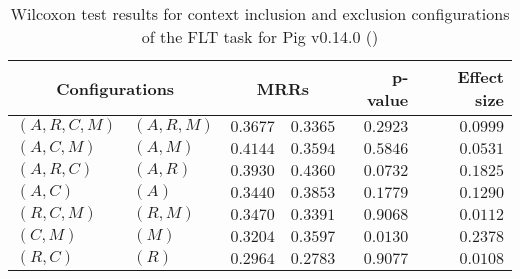
\begin{table}
\begin{spacing}{1.2}
\centering
\caption{Wilcoxon test results for context inclusion and exclusion configurations of the FLT task for Pig v0.14.0 (\ctwo)}
\label{table:versus-wilcox-pig-flt-context}
\begin{tabular}{ll|rr|rr}
\toprule
      \multicolumn{2}{c|}{Configurations} &                \multicolumn{2}{c|}{MRRs} &             p-value & Effect size \\
\midrule
 $(A,R,C,M)$ &  $(A,R,M)$ &  $\bm{0.3677}$ &       $0.3365$ & $0.2923$ &    $0.0999$ \\
   $(A,C,M)$ &    $(A,M)$ &  $\bm{0.4144}$ &       $0.3594$ & $0.5846$ &    $0.0531$ \\
   $(A,R,C)$ &    $(A,R)$ &       $0.3930$ &  $\bm{0.4360}$ & $0.0732$ &    $0.1825$ \\
     $(A,C)$ &      $(A)$ &       $0.3440$ &  $\bm{0.3853}$ & $0.1779$ &    $0.1290$ \\
   $(R,C,M)$ &    $(R,M)$ &  $\bm{0.3470}$ &       $0.3391$ & $0.9068$ &    $0.0112$ \\
     $(C,M)$ &      $(M)$ &       $0.3204$ &  $\bm{0.3597}$ & $0.0130$ &    $0.2378$ \\
     $(R,C)$ &      $(R)$ &  $\bm{0.2964}$ &       $0.2783$ & $0.9077$ &    $0.0108$ \\
\bottomrule
\end{tabular}

\end{spacing}
\end{table}

